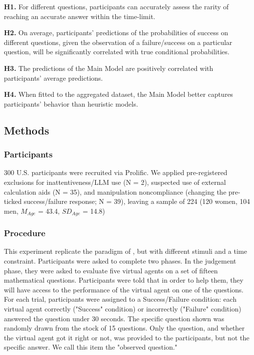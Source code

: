 \documentclass[10pt,letterpaper]{article}
\begin{document}
\textbf{H1.} For different questions, participants can accurately assess the rarity of reaching an accurate answer within the time-limit.

\textbf{H2.} On average, participants' predictions of the probabilities of success on different questions, given the observation of a failure/success on a particular question, will be significantly correlated with true conditional probabilities.

\textbf{H3.} The predictions of the Main Model are positively correlated with participants' average predictions.

\textbf{H4.} When fitted to the aggregated dataset, the Main Model better captures participants' behavior than heuristic models.

\subsection{Methods}\label{methods}

\subsubsection{Participants}\label{participants-1}

300 U.S. participants were recruited via Prolific. We applied pre-registered exclusions for inattentiveness/LLM use (N = 2), suspected use of external calculation aids (N = 35), and manipulation noncompliance (changing the pre-ticked success/failure response; N = 39), leaving a sample of 224 (120 women, 104 men, \(M_{Age}\) = 43.4, \(SD_{Age}\) = 14.8)

\subsubsection{Procedure}\label{behavioral-task}

This experiment replicate the paradigm of \citet{Mercier-2025c}, but with different stimuli and a time constraint. Participants were asked to complete two phases. In the judgement phase, they were asked to evaluate five virtual agents on a set of fifteen mathematical questions. Participants were told that in order to help them, they will have access to the performance of the virtual agent on one of the questions. For each trial, participants were assigned to a Success/Failure condition: each virtual agent correctly ("Success" condition) or incorrectly ("Failure" condition) answered the question under 30 seconds. The specific question shown was randomly drawn from the stock of 15 questions. Only the question, and whether the virtual agent got it right or not, was provided to the participants, but not the specific answer. We call this item the "observed question."
\end{document}
